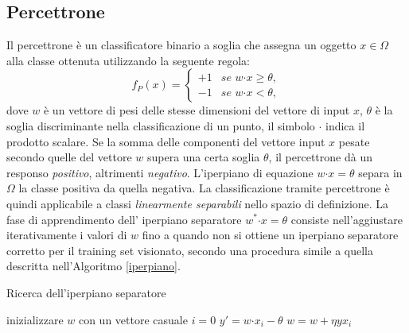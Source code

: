 \documentclass [11pt,a4paper,twoside,openright] {book}
\begin{document}
\subsection{Percettrone}
Il percettrone \cite{rosenblatt1958perceptron} è un classificatore binario a soglia che assegna un oggetto $x \in \Omega$ alla classe ottenuta utilizzando la seguente regola:
\begin{equation}
f_P(x)=
\begin{cases}
+1 & \textit{se } w \boldsymbol{\cdot} x \geq \theta, \\
-1 & \textit{se } w \boldsymbol{\cdot} x < \theta,
\end{cases}
\end{equation}
dove $w$ è un vettore di pesi delle stesse dimensioni del vettore di input $x$, $\theta$ è la soglia discriminante nella classificazione di un punto, il simbolo $\boldsymbol{\cdot}$ indica il prodotto scalare. Se la somma delle componenti del vettore input $x$ pesate secondo quelle del vettore $w$ supera una certa soglia $\theta$, il percettrone dà un responso \textit{positivo}, altrimenti \textit{negativo}. L'iperpiano di equazione $w \boldsymbol{\cdot} x = \theta$ separa in $\Omega$ la classe positiva da quella negativa. La classificazione tramite percettrone è quindi applicabile a classi \textit{linearmente separabili} nello spazio di definizione. La fase di apprendimento dell' iperpiano separatore $w^* \boldsymbol{\cdot} x = \theta$ consiste nell'aggiustare iterativamente i valori di $w$ fino a quando non si ottiene un iperpiano separatore corretto per il training set visionato, secondo una procedura simile a quella descritta nell'Algoritmo \ref{iperpiano}.
\begin{algorithm}
\caption{Ricerca dell'iperpiano separatore}\label{iperpiano}
\begin{algorithmic}[1]
\State inizializzare $w$ con un vettore casuale
	\State $i=0$
		\State $y' = w \boldsymbol{\cdot} x_i - \theta$
		 $w = w + \eta y x_i$ \EndIf
	\EndWhile
\EndWhile
\end{algorithmic}
\end{algorithm}
\end{document}
